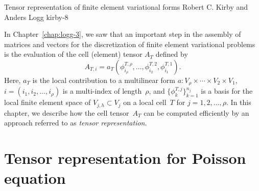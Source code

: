               {Tensor representation of finite element variational forms}
              {Robert C. Kirby and Anders Logg}
              {kirby-8}

In Chapter~\ref{chap:logg-3}, we saw that an important step in the
assembly of matrices and vectors for the discretization of finite
element variational problems is the evaluation of the cell (element)
tensor $A_T$ defined by
\begin{equation}
  A_{T,i}
  = a_T(\phi^{T,\rho}_{i_{\rho}}, \ldots, \phi^{T,2}_{i_2}, \phi^{T,1}_{i_1}).
\end{equation}
Here, $a_T$ is the local contribution to a multilinear form $a:
V_{\rho} \times \cdots \times V_2 \times V_1$,
$i=(i_1,i_2,\dots,i_\rho)$ is a multi-index of length~$\rho$, and
$\{\phi^{T,j}_k\}_{k=1}^{n_j}$ is a basis for the local finite element
space of $V_{j,h} \subset V_j$ on a local cell~$T$ for $j =
1,2,\ldots,\rho$. In this chapter, we describe how the cell
tensor~$A_T$ can be computed efficiently by an approach referred to as
\emph{tensor representation}.

\section{Tensor representation for Poisson equation}


